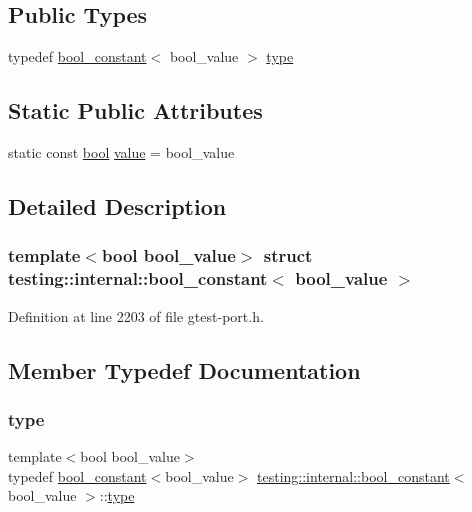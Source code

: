 \subsection*{Public Types}
\begin{DoxyCompactItemize}
\item 
typedef \hyperlink{structtesting_1_1internal_1_1bool__constant}{bool\+\_\+constant}$<$ bool\+\_\+value $>$ \hyperlink{structtesting_1_1internal_1_1bool__constant_aba6d09ecf7eecea6c93480f0d627a167}{type}
\end{DoxyCompactItemize}
\subsection*{Static Public Attributes}
\begin{DoxyCompactItemize}
\item 
static const \hyperlink{classbool}{bool} \hyperlink{structtesting_1_1internal_1_1bool__constant_a499fba6576296b04d99690a486424b32}{value} = bool\+\_\+value
\end{DoxyCompactItemize}


\subsection{Detailed Description}
\subsubsection*{template$<$bool bool\+\_\+value$>$\newline
struct testing\+::internal\+::bool\+\_\+constant$<$ bool\+\_\+value $>$}



Definition at line 2203 of file gtest-\/port.\+h.



\subsection{Member Typedef Documentation}
\mbox{\label{structtesting_1_1internal_1_1bool__constant_aba6d09ecf7eecea6c93480f0d627a167}} 
\subsubsection{\texorpdfstring{type}{type}}
{\footnotesize\ttfamily template$<$bool bool\+\_\+value$>$ \\
typedef \hyperlink{structtesting_1_1internal_1_1bool__constant}{bool\+\_\+constant}$<$bool\+\_\+value$>$ \hyperlink{structtesting_1_1internal_1_1bool__constant}{testing\+::internal\+::bool\+\_\+constant}$<$ bool\+\_\+value $>$\+::\hyperlink{structtesting_1_1internal_1_1bool__constant_aba6d09ecf7eecea6c93480f0d627a167}{type}}




